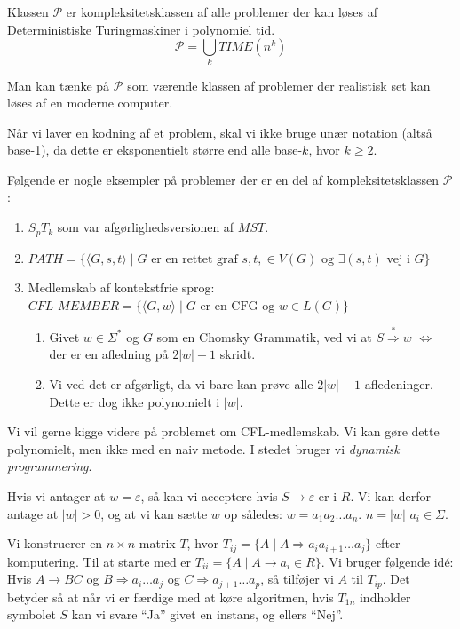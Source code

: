 \begin{definition}
	Klassen $\mathcal{P}$ er kompleksitetsklassen af alle problemer der kan løses af Deterministiske Turingmaskiner i polynomiel tid.
	\begin{equation}
		\mathcal{P} = \bigcup_k TIME(n^{k})
	\end{equation}
\end{definition}

Man kan tænke på $\mathcal{P}$ som værende klassen af problemer der realistisk set kan løses af en moderne computer.

Når vi laver en kodning af et problem, skal vi ikke bruge unær notation (altså base-1), da dette er eksponentielt større end alle base-$k$, hvor $k \ge 2$.


Følgende er nogle eksempler på problemer der er en del af kompleksitetsklassen $\mathcal{P}$:
\begin{enumerate}
	\item $S_{p}T_{k}$ som var afgørlighedsversionen af $MST$.
	\item $PATH = \{\langle G , s, t \rangle \mid G \text{ er en rettet graf } s, t, \in V(G) \text{ og } \exists (s,t) \text{ vej i } G\}$
	\item Medlemskab af kontekstfrie sprog: $CFL\text{-}MEMBER = \{\langle G , w \rangle \mid G \text{ er en CFG og } w \in L(G)\}$
	      \begin{enumerate}
		      \item Givet $w \in \Sigma^{*}$ og $G$ som en Chomsky Grammatik, ved vi at $S \stackrel{*}{\Rightarrow} w$ $\iff$ der er en afledning på $2|w| - 1$ skridt.
		      \item Vi ved det er afgørligt, da vi bare kan prøve alle $2|w|-1$ afledeninger. Dette er dog ikke polynomielt i $|w|$.
	      \end{enumerate}
\end{enumerate}

Vi vil gerne kigge videre på problemet om CFL-medlemskab. Vi kan gøre dette polynomielt, men ikke med en naiv metode. I stedet bruger vi \textit{dynamisk programmering}.

Hvis vi antager at $w = \varepsilon$, så kan vi acceptere hvis $S \rightarrow \varepsilon$ er i $R$. Vi kan derfor antage at $|w| > 0$, og at vi kan sætte $w$ op således: $w = a_{1}a_{2} \ldots a_{n}$. $n = |w|$ $a_{i} \in \Sigma$.

Vi konstruerer en $n \times n $ matrix $T$, hvor $T_{ij} = \{A \mid A \Rightarrow a_{i}a_{i+1} \ldots a_{j}\}$ efter komputering. Til at starte med er $T_{ii} = \{A \mid A \rightarrow a_{i} \in R\}$. Vi bruger følgende idé: Hvis $A \rightarrow BC$ og $B \Rightarrow a_{i} \ldots a_{j}$ og $C \Rightarrow a_{j+1} \ldots a_{p}$, så tilføjer vi $A$ til $T_{ip}$. Det betyder så at når vi er færdige med at køre algoritmen, hvis $T_{1n}$  indholder symbolet $S$ kan vi svare ``Ja'' givet en instans, og ellers ``Nej''.

